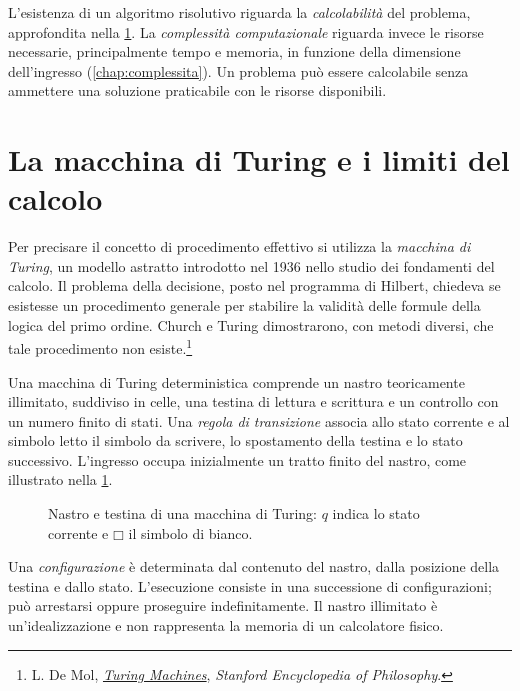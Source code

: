 L'esistenza di un algoritmo risolutivo riguarda la
\emph{calcolabilità} del problema, approfondita nella
\cref{sec:fi-macchina-turing}.
La \emph{complessità computazionale} riguarda invece le risorse
necessarie, principalmente tempo e memoria, in funzione della
dimensione dell'ingresso (\cref{chap:complessita}). Un problema può
essere calcolabile senza ammettere una soluzione praticabile con le
risorse disponibili.

\clearpage

\section{La macchina di Turing e i limiti del calcolo}
\label{sec:fi-macchina-turing}

Per precisare il concetto di procedimento effettivo si utilizza la
\emph{macchina di Turing}, un modello astratto introdotto nel 1936
nello studio dei fondamenti del calcolo. Il problema della decisione,
posto nel programma di Hilbert, chiedeva se esistesse un procedimento generale
per stabilire la validità delle formule della logica del primo ordine.
Church e Turing dimostrarono, con metodi diversi, che tale procedimento
non esiste.\footnote{L. De Mol,
\href{https://plato.stanford.edu/entries/turing-machine/}
{\emph{Turing Machines}}, \emph{Stanford Encyclopedia of Philosophy}.}

Una macchina di Turing deterministica comprende un nastro teoricamente
illimitato, suddiviso in celle, una testina di lettura e scrittura e
un controllo con un numero finito di stati. Una \emph{regola di
transizione} associa allo stato corrente e al simbolo letto il simbolo
da scrivere, lo spostamento della testina e lo stato successivo.
L'ingresso occupa inizialmente un tratto finito del nastro,
come illustrato nella \cref{fig:fi-nastro-turing}.

\begin{figure}[htbp]
  \centering
  
  \caption{Nastro e testina di una macchina di Turing: \(q\) indica
  lo stato corrente e \(\mdlgwhtsquare\) il simbolo di bianco.}
  \label{fig:fi-nastro-turing}
\end{figure}

Una \emph{configurazione} è determinata dal contenuto del nastro,
dalla posizione della testina e dallo stato. L'esecuzione consiste
in una successione di configurazioni; può arrestarsi oppure proseguire
indefinitamente. Il nastro illimitato è un'idealizzazione e non
rappresenta la memoria di un calcolatore fisico.

